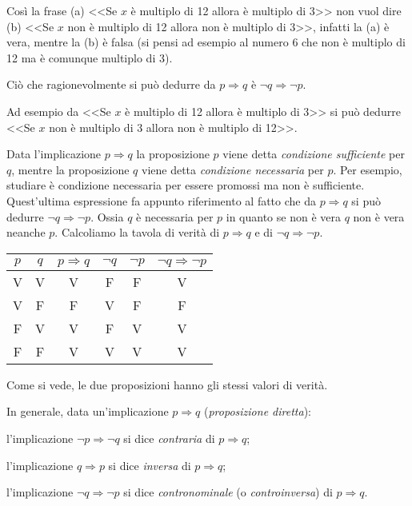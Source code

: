 Così la frase (a) <<Se $x$ è multiplo di 12 allora è multiplo di 3>> non vuol dire (b) <<Se $x$ non è multiplo di 12 allora non è multiplo di 3>>, infatti la (a) è vera, mentre la (b) è falsa (si pensi ad esempio al numero 6 che non è multiplo di 12 ma è comunque multiplo di 3).

Ciò che ragionevolmente si può dedurre da $p\Rightarrow q$ è $\neg q\Rightarrow \neg p$.

Ad esempio da <<Se $x$ è multiplo di 12 allora è multiplo di 3>> si può dedurre <<Se $x$ non è multiplo di 3 allora non è multiplo di 12>>.

Data l'implicazione $p\Rightarrow q$ la proposizione $p$ viene detta \emph{condizione sufficiente} per $q$, mentre la proposizione $q$ viene detta \emph{condizione necessaria} per $p$.
Per esempio, studiare è condizione necessaria per essere promossi ma non è sufficiente.
Quest'ultima espressione fa appunto riferimento al fatto che da $p\Rightarrow q$ si può dedurre $\neg q\Rightarrow \neg p$. Ossia $q$ è necessaria per $p$ in quanto se non è vera $q$ non è vera neanche $p$.
Calcoliamo la tavola di verità di $p\Rightarrow q$ e di $\neg q\Rightarrow \neg p$.
\begin{center}
 \begin{tabular*}{.5 \textwidth}{@{\extracolsep{\fill}}*{6}{c}}
 \toprule
$p$ &$q$ &$p\Rightarrow q$ &$\neg q$ &$\neg p$ &$\neg q \Rightarrow \neg p$\\
\midrule
V&	V&	V&	F&	F&	V\\
V&	F&	F&	V&	F&	F\\
F&	V&	V&	F&	V&	V\\
F&	F&	V&	V&	V&	V\\
\bottomrule
 \end{tabular*}
\end{center}
Come si vede, le due proposizioni hanno gli stessi valori di verità.

In generale, data un'implicazione $p\Rightarrow q$ (\emph{proposizione diretta}):
\begin{itemize*}
\item l'implicazione $\neg p\Rightarrow \neg q$ si dice \emph{contraria} di $p\Rightarrow q$;
\item l'implicazione $q\Rightarrow p$ si dice \emph{inversa} di $p\Rightarrow q$;
\item l'implicazione $\neg q\Rightarrow \neg p$ si dice \emph{contronominale} (o \emph{controinversa}) di $p\Rightarrow q$.
\end{itemize*}

